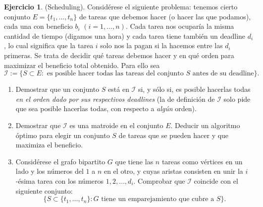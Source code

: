 \documentclass[10pt]{article}
\theoremstyle{definition}
\newtheorem{ejer}{Ejercicio}
\begin{document}
\begin{ejer} (Scheduling). Considérese el siguiente problema: tenemos cierto conjunto $E=\{t_1,\ldots,t_n\}$ de tareas que debemos hacer (o hacer las que podamos), cada una con beneficio $b_i$ $(i=1,\ldots, n)$. Cada tarea nos ocuparía la misma cantidad de tiempo (digamos una hora) y cada tarea tiene también un deadline $d_i$, lo cual significa que la tarea $i$ solo nos la pagan si la hacemos entre las $d_i$ primeras. Se trata de decidir qué tareas debemos hacer y en qué orden para maximizar el beneficio total obtenido. Para ello sea 
$$\mathcal{I}:=\{S\subset E: \text{ es posible hacer todas las tareas del conjunto $S$ antes de su deadline}\}.$$
\begin{enumerate}[labelindent=\parindent, label=(\alph*), ref=\alph*]
\item Demostrar que un conjunto $S$ está en $\mathcal{I}$ si, y sólo si, es posible hacerlas todas \textit{en el orden dado por sus respectivos deadlines} (la de definición de $\mathcal{I}$ solo pide que sea posible hacerlas todas, con respecto a \textit{algún} orden).

\item Demostrar que $\mathcal{I}$ es una matroide en el conjunto $E$. Deducir un algoritmo óptimo para elegir un conjunto $S$ de tareas que se pueden hacer y que maximiza el beneficio.
\item Considérese el grafo bipartito $G$ que tiene las $n$ tareas como vértices en un lado y los números del $1$ a $n$ en el otro, y cuyas aristas consisten en unir la $i$-ésima tarea con los números $1,2,\ldots,d_i
$. Comprobar que $\mathcal{I}$ coincide con el siguiente conjunto:
$$\{S\subset \{t_1,\ldots,t_n\}: G\text{ tiene un emparejamiento que cubre a }S\}.$$
\end{enumerate}
\end{ejer}
\end{document}

